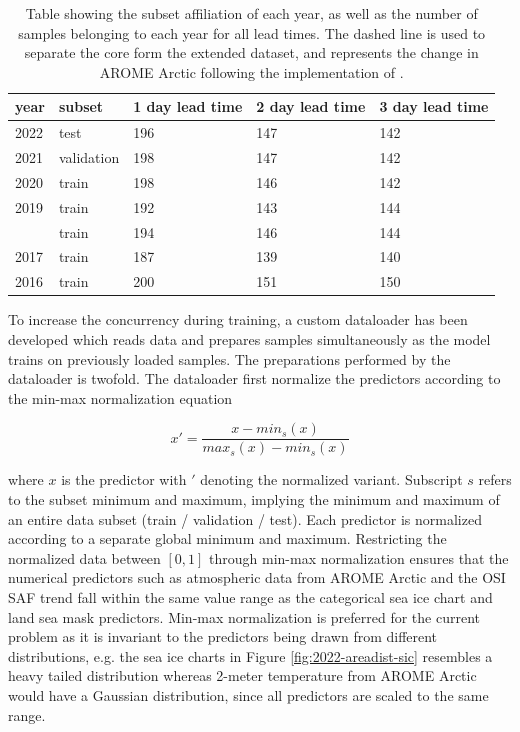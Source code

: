 \documentclass[../main/thesis]{subfiles}
\begin{document}
\begin{table}[]
    \caption{\label{tab:data_subset_sizes}Table showing the subset affiliation of each year, as well as the number of samples belonging to each year for all lead times. The dashed line is used to separate the core form the extended dataset, and represents the change in AROME Arctic following the implementation of \protect\citep{Batrak2019}.}
    \centering
    \setlength{\arrayrulewidth}{0.5mm}
    \renewcommand{\arraystretch}{1.3}
    \begin{tabular}{lllll}
    \hline
    year   & subset & 1 day lead time & 2 day lead time & 3 day lead time \\
    \hline
    2022 & test       & 196 & 147 & 142 \\
    2021 & validation & 198 & 147 & 142 \\
    2020 & train      & 198 & 146 & 142 \\
    2019 & train      & 192 & 143 & 144 \\
    \hdashline
    2018 & train      & 194 & 146 & 144 \\
    2017 & train      & 187 & 139 & 140 \\
    2016 & train      & 200 & 151 & 150 \\
    \hline         
    \end{tabular}
\end{table}

To increase the concurrency during training, a custom dataloader has been developed which reads data and prepares samples simultaneously as the model trains on previously loaded samples. The preparations performed by the dataloader is twofold. The dataloader first normalize the predictors according to the min-max normalization equation 

\begin{equation}
    x' = \frac{x - min_s(x)}{max_s(x) - min_s(x)}
\end{equation}

where $x$ is the predictor with $'$ denoting the normalized variant. Subscript $s$ refers to the subset minimum and maximum, implying the minimum and maximum of an entire data subset (train / validation / test). Each predictor is normalized according to a separate global minimum and maximum. Restricting the normalized data between $\left[0, 1\right]$ through min-max normalization ensures that the numerical predictors such as atmospheric data from AROME Arctic and the OSI SAF trend fall within the same value range as the categorical sea ice chart and land sea mask predictors. Min-max normalization is preferred for the current problem as it is invariant to the predictors being drawn from different distributions, e.g. the sea ice charts in Figure \ref{fig:2022-areadist-sic} resembles a heavy tailed distribution whereas 2-meter temperature from AROME Arctic would have a Gaussian distribution, since all predictors are scaled to the same range.
\end{document}
